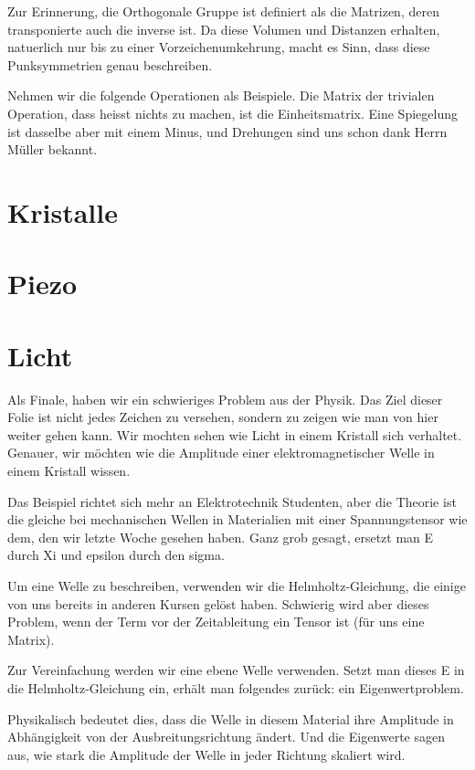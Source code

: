 \documentclass[a4paper]{article}
\newcommand{\scene}[1]{\par\noindent[ #1 ]\par}
\begin{document}
Zur Erinnerung, die Orthogonale Gruppe ist definiert als die Matrizen, deren
transponierte auch die inverse ist. Da diese Volumen und Distanzen erhalten,
natuerlich nur bis zu einer Vorzeichenumkehrung, macht es Sinn, dass diese
Punksymmetrien genau beschreiben.

Nehmen wir die folgende Operationen als Beispiele. Die Matrix der trivialen
Operation, dass heisst nichts zu machen, ist die Einheitsmatrix. Eine
Spiegelung ist dasselbe aber mit einem Minus, und Drehungen sind uns schon
dank Herrn M\"uller bekannt.

\section{Kristalle}
\scene{Spontan}

\section{Piezo}
\scene{Spontan}

\section{Licht}
Als Finale, haben wir ein schwieriges Problem aus der Physik. Das Ziel dieser
Folie ist nicht jedes Zeichen zu versehen, sondern zu zeigen wie man von hier
weiter gehen kann. Wir mochten sehen wie Licht in einem Kristall sich
verhaltet. Genauer, wir m\"ochten wie die Amplitude einer
elektromagnetischer Welle in einem Kristall wissen.

Das Beispiel richtet sich mehr an Elektrotechnik Studenten, aber die Theorie
ist die gleiche bei mechanischen Wellen in Materialien mit einer
Spannungstensor wie dem, den wir letzte Woche gesehen haben. Ganz grob gesagt,
ersetzt man E durch Xi und epsilon durch den sigma.

Um eine Welle zu beschreiben, verwenden wir die Helmholtz-Gleichung, die einige
von uns bereits in anderen Kursen gel\"ost haben.  Schwierig wird aber dieses
Problem, wenn der Term vor der Zeitableitung ein Tensor ist (f\"ur uns eine Matrix).

Zur Vereinfachung werden wir eine ebene Welle verwenden. Setzt man dieses E in
die Helmholtz-Gleichung ein, erhält man folgendes zurück: ein Eigenwertproblem.

Physikalisch bedeutet dies, dass die Welle in diesem Material ihre Amplitude in
Abhängigkeit von der Ausbreitungsrichtung ändert.  Und die Eigenwerte sagen
aus, wie stark die Amplitude der Welle in jeder Richtung skaliert wird.
\end{document}

